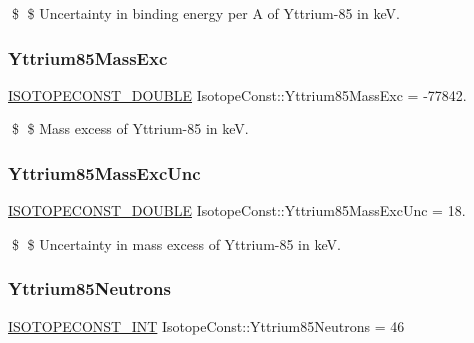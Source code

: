 \$ \$ Uncertainty in binding energy per A of Yttrium-\/85 in keV. \mbox{\label{group___isotope_const-_yttrium-_y85_ga34d7069902fccfeeb81122bb821222ca}} 
\subsubsection{\texorpdfstring{Yttrium85\+Mass\+Exc}{Yttrium85MassExc}}
{\footnotesize\ttfamily \mbox{\hyperlink{group___isotope_const-_macros_ga8f45a7272ce02c0b4c65c44636ed719a}{I\+S\+O\+T\+O\+P\+E\+C\+O\+N\+S\+T\+\_\+\+D\+O\+U\+B\+LE}} Isotope\+Const\+::\+Yttrium85\+Mass\+Exc = -\/77842.}

\$ \$ Mass excess of Yttrium-\/85 in keV. \mbox{\label{group___isotope_const-_yttrium-_y85_gac79d5bb05b5db5f0e2742b81d98200b4}} 
\subsubsection{\texorpdfstring{Yttrium85\+Mass\+Exc\+Unc}{Yttrium85MassExcUnc}}
{\footnotesize\ttfamily \mbox{\hyperlink{group___isotope_const-_macros_ga8f45a7272ce02c0b4c65c44636ed719a}{I\+S\+O\+T\+O\+P\+E\+C\+O\+N\+S\+T\+\_\+\+D\+O\+U\+B\+LE}} Isotope\+Const\+::\+Yttrium85\+Mass\+Exc\+Unc = 18.}

\$ \$ Uncertainty in mass excess of Yttrium-\/85 in keV. \mbox{\label{group___isotope_const-_yttrium-_y85_gaaba0b907df5cdcee24ea61feae6bdb18}} 
\subsubsection{\texorpdfstring{Yttrium85\+Neutrons}{Yttrium85Neutrons}}
{\footnotesize\ttfamily \mbox{\hyperlink{group___isotope_const-_macros_ga5f18360b3e99483a35c32d789e62621c}{I\+S\+O\+T\+O\+P\+E\+C\+O\+N\+S\+T\+\_\+\+I\+NT}} Isotope\+Const\+::\+Yttrium85\+Neutrons = 46}

